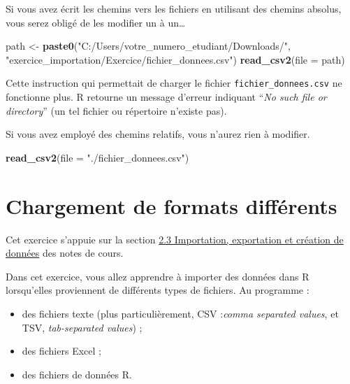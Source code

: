 \documentclass[
  11pt,
]{book}
\newenvironment{Shaded}{\begin{snugshade}}{\end{snugshade}}
\newcommand{\AttributeTok}[1]{\textcolor[rgb]{0.13,0.29,0.53}{#1}}
\newcommand{\FunctionTok}[1]{\textcolor[rgb]{0.13,0.29,0.53}{\textbf{#1}}}
\newcommand{\NormalTok}[1]{#1}
\newcommand{\OtherTok}[1]{\textcolor[rgb]{0.56,0.35,0.01}{#1}}
\newcommand{\StringTok}[1]{\textcolor[rgb]{0.31,0.60,0.02}{#1}}
\providecommand{\tightlist}{%
  \setlength{\itemsep}{0pt}\setlength{\parskip}{0pt}}
\numberwithin{equation}{section}
\numberwithin{countremarque}{section}
\newenvironment{orangebox}{
  \begin{tcolorbox}[breakable, colback=oran,coltext=white,
                  colframe=grisfonce]}
 {\end{tcolorbox}}
\begin{document}
Si vous avez écrit les chemins vers les fichiers en utilisant des chemins absolus, vous serez obligé de les modifier un à un\ldots{}

\begin{Shaded}
\begin{Highlighting}[]
\NormalTok{path }\OtherTok{\textless{}{-}} \FunctionTok{paste0}\NormalTok{(}\StringTok{"C:/Users/votre\_numero\_etudiant/Downloads/"}\NormalTok{,}
               \StringTok{"exercice\_importation/Exercice/fichier\_donnees.csv"}\NormalTok{)}
\FunctionTok{read\_csv2}\NormalTok{(}\AttributeTok{file =}\NormalTok{ path)}
\end{Highlighting}
\end{Shaded}

Cette instruction qui permettait de charger le fichier \texttt{fichier\_donnees.csv} ne fonctionne plus. R retourne un message d'erreur indiquant ``\emph{No such file or directory}'' (un tel fichier ou répertoire n'existe pas).

Si vous avez employé des chemins relatifs, vous n'aurez rien à modifier.

\begin{Shaded}
\begin{Highlighting}[]
\FunctionTok{read\_csv2}\NormalTok{(}\AttributeTok{file =} \StringTok{"./fichier\_donnees.csv"}\NormalTok{)}
\end{Highlighting}
\end{Shaded}

\hypertarget{chargement-de-formats-diffuxe9rents}{%
\section{Chargement de formats différents}\label{chargement-de-formats-diffuxe9rents}}

\begin{orangebox}
Cet exercice s'appuie sur la section \href{http://egallic.fr/Enseignement/R/Book/donn\%C3\%A9es.html\#importation-exportation-et-cr\%C3\%A9ation-de-donn\%C3\%A9es}{2.3 Importation, exportation et création de données} des notes de cours.

\end{orangebox}

Dans cet exercice, vous allez apprendre à importer des données dans R lorsqu'elles proviennent de différents types de fichiers. Au programme :

\begin{itemize}
\tightlist
\item
  des fichiers texte (plus particulièrement, CSV :\emph{comma separated values}, et TSV, \emph{tab-separated values}) ;
\item
  des fichiers Excel ;
\item
  des fichiers de données R.
\end{itemize}
\end{document}

